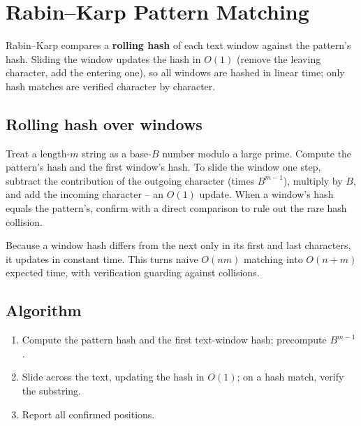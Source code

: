 \section{Rabin--Karp Pattern Matching}
\label{sec:str-rabin-karp}


\begin{patternbox}
Rabin--Karp compares a \textbf{rolling hash} of each text window against the
pattern's hash. Sliding the window updates the hash in $O(1)$ (remove the
leaving character, add the entering one), so all windows are hashed in
linear time; only hash matches are verified character by character.
\end{patternbox}

\subsection*{Rolling hash over windows}

Treat a length-$m$ string as a base-$B$ number modulo a large prime. Compute
the pattern's hash and the first window's hash. To slide the window one
step, subtract the contribution of the outgoing character (times $B^{m-1}$),
multiply by $B$, and add the incoming character -- an $O(1)$ update. When a
window's hash equals the pattern's, confirm with a direct comparison to rule
out the rare hash collision.

\begin{ideabox}
Because a window hash differs from the next only in its first and last
characters, it updates in constant time. This turns naive $O(nm)$ matching
into $O(n+m)$ expected time, with verification guarding against collisions.
\end{ideabox}

\subsection*{Algorithm}

\begin{enumerate}
  \item Compute the pattern hash and the first text-window hash; precompute
        $B^{m-1}$.
  \item Slide across the text, updating the hash in $O(1)$; on a hash
        match, verify the substring.
  \item Report all confirmed positions.
\end{enumerate}

